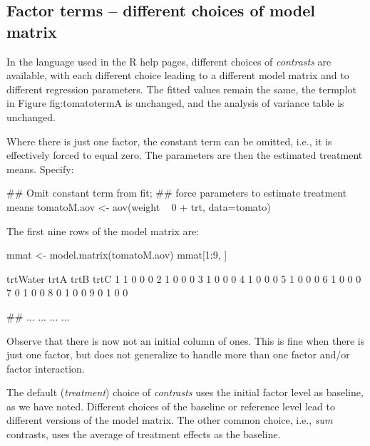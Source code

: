 \documentclass{tufte-book}\usepackage[]{graphicx}\usepackage[]{color}
\begin{document}
\subsection{Factor terms -- different choices of model matrix}

In the language used in the R help pages, different choices of
\textit{contrasts} are available, with each different choice leading
to a different model matrix and to different regression parameters.
The fitted values remain the same, the termplot in Figure {fig:tomatoterm}A
is unchanged, and the analysis of variance table is unchanged.

Where there is just one factor, the constant term can be omitted,
i.e., it is effectively forced to equal zero. The parameters are then
the estimated treatment means. Specify:
\begin{Schunk}
\begin{Sinput}
## Omit constant term from fit;
## force parameters to estimate treatment means
tomatoM.aov <- aov(weight ~ 0 + trt, data=tomato)
\end{Sinput}
\end{Schunk}

The first nine rows of the model matrix are:
\begin{Schunk}
\begin{Sinput}
mmat <- model.matrix(tomatoM.aov)
mmat[1:9, ]
\end{Sinput}
\begin{Soutput}
  trtWater trtA trtB trtC
1        1    0    0    0
2        1    0    0    0
3        1    0    0    0
4        1    0    0    0
5        1    0    0    0
6        1    0    0    0
7        0    1    0    0
8        0    1    0    0
9        0    1    0    0
\end{Soutput}
\begin{Sinput}
## ...   ...    ...    ...
\end{Sinput}
\end{Schunk}
Observe that there is now not an initial column of ones.
This is fine when there is just one factor, but does not generalize to
handle more than one factor and/or factor interaction.

The default (\textit{treatment}) choice of \textit{contrasts} uses the
initial factor level as baseline, as we have noted.  Different choices
of the baseline or reference level lead to different versions of the
model matrix.  The other common choice, i.e., \textit{sum} contrasts,
uses the average of treatment effects as the baseline.
\end{document}

